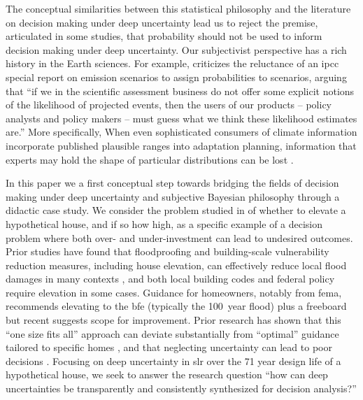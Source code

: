 \documentclass[11pt]{article}
\newcommand{\klaus}[1]{\todo[color=rosso, textcolor=grigio]{\textbf{ATTN Klaus:~}#1}}
\begin{document}
The conceptual similarities between this statistical philosophy and the literature on decision making under deep uncertainty lead us to reject the premise, articulated in some studies,\klaus{is it ok to not cite any here} that probability should not be used to inform decision making under deep uncertainty.
Our subjectivist perspective has a rich history in the Earth sciences.
For example, \citet{schneider_scenarios:2002} criticizes the reluctance of an \gls{ipcc} special report on emission scenarios \citep{nakicenovic_scenarios:2000} to assign probabilities to scenarios, arguing that ``if we in the scientific assessment business do not offer some explicit notions of the likelihood of projected events, then the users of our products -- policy analysts and policy makers -- must guess what we think these likelihood estimates are.''
More specifically,
When even sophisticated \citep[or so we like to think; see][and references therein]{fuller_inversion:2017} consumers of climate information incorporate published plausible ranges into adaptation planning, information that experts may hold the shape of particular distributions can be lost \citep[as warned in][]{moss_uncertainties:2000}.

In this paper we a first conceptual step towards bridging the fields of decision making under deep uncertainty and subjective Bayesian philosophy through  a didactic case study.
We consider the problem studied in \citet{zarekarizi_suboptimal:2020} of whether to elevate a hypothetical house, and if so how high, as a specific example of a decision problem where both over- and under-investment can lead to undesired outcomes.
Prior studies have found that floodproofing and building-scale vulnerability reduction measures, including house elevation, can effectively reduce local flood damages in many contexts \citep{demoel_reducing:2014,deruig_building:2020,kreibich_building:2005,slotter_floodproofing:2020,Rozer:2016dn,mobley_mitigation:2020,aerts_cost:2018}, and both local building codes \citep{asce_7-10:2013,bruneau_multihazard:2017,asce_24-05:2006} and federal policy \citep{FEMA_p-55:2011} require elevation in some cases.
Guidance for homeowners, notably from \gls{fema}, recommends elevating to the \gls{bfe} (typically the \SI{100}{year} flood) plus a freeboard \citep{fema_retrofitting:2014,asce_24-14:2015,fema_retrofitting:2014} but recent suggests scope for improvement.
Prior research has shown that this ``one size fits all'' approach can deviate substantially from ``optimal'' guidance tailored to specific homes \citep{xian_elevation:2017}, and that neglecting uncertainty can lead to poor decisions \citep{zarekarizi_suboptimal:2020}.
Focusing on deep uncertainty in \gls{slr} over the 71 year design life of a hypothetical house, we seek to answer the research question ``how can deep uncertainties be transparently and consistently synthesized for decision analysis?''
\end{document}
